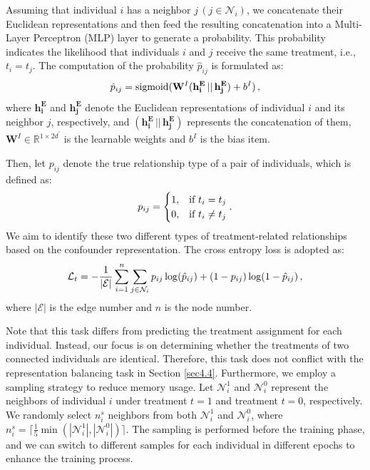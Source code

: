 \documentclass[twoside,leqno,twocolumn]{article}
\begin{document}
Assuming that individual $i$ has a neighbor $j \,(j \in \mathcal{N}_i)$, we concatenate their Euclidean representations and then feed the resulting concatenation into a Multi-Layer Perceptron (MLP) layer to generate a probability. This probability indicates the likelihood that individuals $i$ and $j$ receive the same treatment, i.e., $t_i=t_j$. The computation of the probability $\hat{p}_{ij}$ is formulated as:
\begin{equation}
\vspace{-0.2em}
\label{eq9}
    \hat{p}_{ij} = \text{sigmoid}(\mathbf{W}^I(\mathbf{h^E_i} \,||\, \mathbf{h^E_j}) + {b}^I) \,,
\end{equation}
where $\mathbf{h^E_i}$ and $\mathbf{h^E_j}$ denote the Euclidean representations of individual $i$ and its neighbor $j$, respectively, and $(\mathbf{h^E_i} \,||\, \mathbf{h^E_j})$ represents the concatenation of them, $\mathbf{W}^I \in \mathbb R^{1\times 2d^\prime} $ is the learnable weights and ${b}^I$ is the bias item. 

Then, let $p_{ij}$ denote the true relationship type of a pair of individuals, which is defined as:
\begin{equation}
\label{eq10}
 \vspace{-0.2em}
    \begin{aligned} 
    p_{ij} &= \begin{cases} 1, &\text{if } t_i=t_j \\ 
    0, &\text{if } t_i \neq t_j \end{cases} \\
    \end{aligned} \,.
\end{equation} 
We aim to identify these two different types of treatment-related relationships based on the confounder representation. The cross entropy loss is adopted as:
\begin{equation}
\vspace{-0.4em}
\label{eq11}
    \mathcal{L}_t = - \frac{1}{|\mathcal{E}|} \sum_{i=1}^{n}  \sum_{j \in \mathcal{N}_i} 
    p_{ij} \log(\hat{p}_{ij}) + (1-p_{ij}) \log(1-\hat{p}_{ij}) \,,
\end{equation}
where $|\mathcal{E}|$ is the edge number and $n$ is the node number.

Note that this task differs from predicting the treatment assignment for each individual. Instead, our focus is on determining whether the treatments of two connected individuals are identical. Therefore, this task does not conflict with the representation balancing task in Section \ref{sec4.4}.
Furthermore, we employ a sampling strategy to reduce memory usage. Let $\mathcal{N}_i^1$ and $\mathcal{N}_i^0$ represent the neighbors of individual $i$ under treatment $t=1$ and treatment $t=0$, respectively. We randomly select $n_i^s$ neighbors from both $\mathcal{N}_i^1$ and $\mathcal{N}_i^0$, where
$n_i^s = \lceil \frac{1}{5}{\mathop{min}(|\mathcal{N}_i^1|, |\mathcal{N}_i^0|)} \rceil$. The sampling is performed before the training phase, and we can switch to different samples for each individual in different epochs to enhance the training process.
\end{document}
